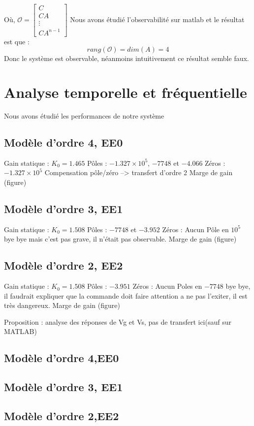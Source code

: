 Où, $ \mathcal{O} = \begin{bmatrix} C \\ CA \\ \vdots \\ CA^{n−1} \end{bmatrix}$
Nous avons étudié l'observabilité sur matlab et le résultat est que :
$$rang(\mathcal{O}) = dim(A)=4 $$
Donc le système est observable, néanmoins intuitivement ce résultat semble faux.

\section{Analyse temporelle et fréquentielle}
Nous avons étudié les performances de notre système 

\subsection{Modèle d'ordre 4, EE0}

Gain statique : $K_0 = 1.465$
Pôles :  $-1.327\times 10^5$, $-7748$ et $-4.066$
Zéros : $-1.327\times  10^5$
Compensation pôle/zéro --> transfert d'ordre 2
Marge de gain (figure)


\subsection{Modèle d'ordre 3, EE1}
Gain statique : $K_0 = 1.508$
Pôles :  $-7748$ et $-3.952$
Zéros : Aucun
Pôle en $10^5$ bye bye mais c'est pas grave, il n'était pas observable.
Marge de gain (figure)

\subsection{Modèle d'ordre 2, EE2}
Gain statique : $K_0 = 1.508$
Pôles : $-3.951$
Zéros : Aucun
Poles en $-7748$ bye bye, il faudrait expliquer que la commande doit faire attention a ne pas l'exiter, il est très dangereux.
Marge de gain (figure)
 
Proposition : analyse des réponses de Vg et Vs, pas de transfert ici(sauf sur MATLAB) 
\subsection{Modèle d'ordre 4,EE0}

\subsection{Modèle d'ordre 3, EE1}
\subsection{Modèle d'ordre 2,EE2}